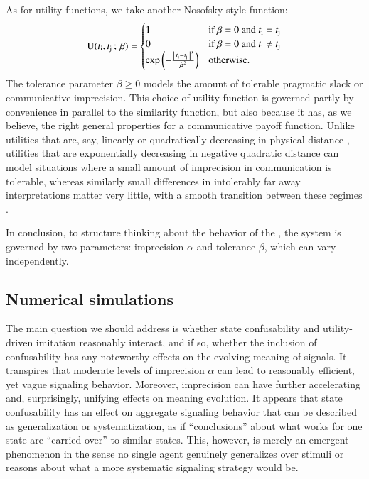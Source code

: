 \documentclass[fleqn,reqno,10pt]{article}
\newcommand{\icid}{\acro{icid}} %
\newcommand{\imprecision}{\ensuremath{\alpha}} %
\newcommand{\toler}{\ensuremath{\beta}} %
\begin{document}
As for utility functions, we take another Nosofsky-style function:
\begin{align*}
  \util(\mystate{i}, \mystate{j} \myts ; \myts \toler) =
      \begin{cases}
    1 & \textrm{if } \toler = 0 \textrm{ and } \mystate{i} = \mystate{j} \\
    0 & \textrm{if } \toler = 0 \textrm{ and } \mystate{i} \neq \mystate{j} \\
 \expo \left ( -  \frac{\card{\mystate{i} - \mystate{j}}^s}{ \toler^2} \right ) & \textrm{otherwise.} \\
    \end{cases}
\end{align*}
The tolerance parameter $\toler \ge 0$ models the amount of tolerable pragmatic slack or
communicative imprecision. This choice of utility function is governed partly by convenience in
parallel to the similarity function, but also because it has, as we believe, the right general
properties for a communicative payoff function. Unlike utilities that are, say, linearly or
quadratically decreasing in physical distance
\citep[c.f.][]{JagerMetzger2011:Voronoi-Languag,FrankeJager2010:Vagueness-Signa}, utilities
that are exponentially decreasing in negative quadratic distance can model situations where a
small amount of imprecision in communication is tolerable, whereas similarly small differences
in intolerably far away interpretations matter very little, with a smooth transition between
these regimes \citep[c.f.][]{OConnor2013:The-Evolution-o}.

In conclusion, to structure thinking about the behavior of the \icid, the system is governed by
two parameters: imprecision $\imprecision$ and tolerance $\toler$, which can vary
independently.


\subsection{Numerical simulations}
\label{sec:simulations}

The main question we should address is whether state confusability and utility-driven imitation
reasonably interact, and if so, whether the inclusion of confusability has any noteworthy
effects on the evolving meaning of signals. It transpires that moderate levels of imprecision
$\imprecision$ can lead to reasonably efficient, yet vague signaling behavior. Moreover,
imprecision can have further accelerating and, surprisingly, unifying effects on meaning
evolution. It appears that state confusability has an effect on aggregate signaling behavior
that can be described as generalization or systematization, as if ``conclusions'' about what
works for one state are ``carried over'' to similar states. This, however, is merely an
emergent phenomenon in the sense no single agent genuinely generalizes over stimuli or reasons
about what a more systematic signaling strategy would be.
\end{document}
